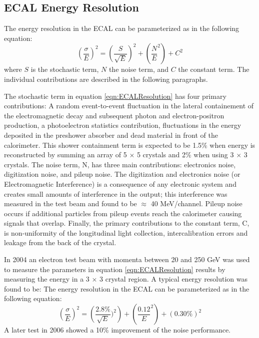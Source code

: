 \subsection{ECAL Energy Resolution}
The energy resolution in the ECAL can be parameterized as in the following equation:
\begin{displaymath}
\left(\frac{\sigma}{E}\right)^{2}=\left(\frac{S}{\sqrt{E}}\right)^{2}+\left(\frac{N}{E}^{2}\right)+C^{2}
\label{eqn:ECALResolution}
\end{displaymath}
where $S$ is the stochastic term, $N$ the noise term, and $C$ the constant term. 
The individual contributions are described in the following paragraphs.

The stochastic term in equation \ref{eqn:ECALResolution} has four primary contributions:
A random event-to-event fluctuation in the lateral containement of the
electromagnetic decay and subsequent photon and electron-positron production,
a photoelectron statistics contribution, fluctuations in the energy
deposited in the preshower absorber and dead material in front of the calorimeter. %
This shower containment term is expected to be 1.5\% when energy is 
reconstructed by summing an array of 5 $\times$ 5 crystals and 2\%
when using 3 $\times$ 3 crystals. 
The noise term, N, has three main contributions: electronics noise, digitization 
noise, and pileup noise. The digitization and electronics noise (or Electromagnetic Interference)
is a consequence of any electronic system and creates small amounts of
interference in the output; this interference was measured in the test beam and 
found to be $\approx$ 40 MeV/channel. 
Pileup noise occurs if additional particles from pileup events reach the 
calorimeter causing signals that overlap. 
Finally, the primary contributions to the constant term, C, is non-uniformity
of the longitudinal light collection, intercalibration errors and leakage from the 
back of the crystal. 

In 2004 an electron test beam with momenta between 20 and 250 GeV 
was used to measure the parameters in equation \ref{eqn:ECALResolution}
results by measuring the energy in a 3 $\times$ 3 crystal region. A typical
energy resolution was found to be:
The energy resolution in the ECAL can be parameterized as in the following equation:
\begin{displaymath}
\left(\frac{\sigma}{E}\right)^{2}=\left(\frac{2.8\%}{\sqrt{E}})^{2}\right)+\left(\frac{0.12}{E}^{2}\right)+(0.30\%)^{2}
\label{eqn:ECALResolution}
\end{displaymath}
A later test in 2006 showed a 10\% improvement of the noise performance.




